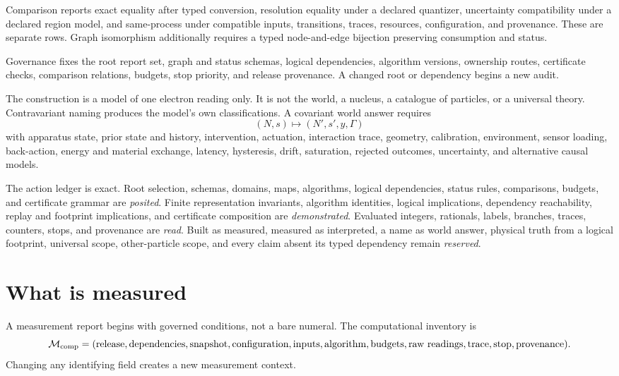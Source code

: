 Comparison reports exact equality after typed conversion, resolution equality under a declared quantizer, uncertainty
compatibility under a declared region model, and same-process under compatible inputs, transitions, traces, resources,
configuration, and provenance.  These are separate rows.  Graph isomorphism additionally requires a typed
node-and-edge bijection preserving consumption and status.

Governance fixes the root report set, graph and status schemas, logical dependencies, algorithm versions, ownership
routes, certificate checks, comparison relations, budgets, stop priority, and release provenance.  A changed root or
dependency begins a new audit.

The construction is a model of one electron reading only.  It is not the world, a nucleus, a catalogue of particles,
or a universal theory.  Contravariant naming produces the model's own classifications.  A covariant world answer
requires
\[
(N,s)\longmapsto(N',s',y,\Gamma)
\]
with apparatus state, prior state and history, intervention, actuation, interaction trace, geometry, calibration,
environment, sensor loading, back-action, energy and material exchange, latency, hysteresis, drift, saturation,
rejected outcomes, uncertainty, and alternative causal models.

The action ledger is exact.  Root selection, schemas, domains, maps, algorithms, logical dependencies, status rules,
comparisons, budgets, and certificate grammar are \emph{posited}.  Finite representation invariants, algorithm
identities, logical implications, dependency reachability, replay and footprint implications, and certificate
composition are \emph{demonstrated}.  Evaluated integers, rationals, labels, branches, traces, counters, stops, and
provenance are \emph{read}.  Built as measured, measured as interpreted, a name as world answer, physical truth from
a logical footprint, universal scope, other-particle scope, and every claim absent its typed dependency remain
\emph{reserved}.
\section{What is measured}

A measurement report begins with governed conditions, not a bare numeral.  The computational inventory is
\[
\mathcal M_{\rm comp}=(\text{release},\text{dependencies},\text{snapshot},
\text{configuration},\text{inputs},\text{algorithm},\text{budgets},
\text{raw readings},\text{trace},\text{stop},\text{provenance}).
\]
Changing any identifying field creates a new measurement context.

